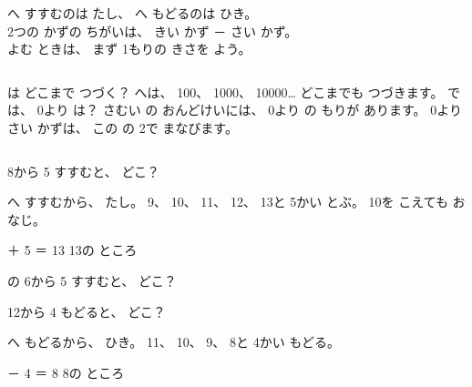 \begin{taisetsu}
へ すすむのは たし、 へ もどるのは ひき。\\
2つの かずの ちがいは、 きい かず － さい かず。\\
よむ ときは、 まず 1もりの きさを よう。
\end{taisetsu}

\begin{column}{は どこまで つづく？}
へは、 100、 1000、 10000… どこまでも つづきます。 では、 0より は？ さむい の おんどけいには、 0より の もりが あります。 0より さい かずは、 この の 2で まなびます。
\end{column}

\clearpage

\begin{reidai}[\R{右}{みぎ}へ すすむ]
8から 5 すすむと、 どこ？
\begin{bkfigure}
\end{bkfigure}
\kangaekata {}へ すすむから、 たし。 9、 10、 11、 12、 13と 5かい とぶ。 10を こえても おなじ。

 ＋ 5 ＝ 13 \kotaenext 13の ところ
\end{reidai}

\begin{jibun}
の 6から 5 すすむと、 どこ？
\bkshikiran[9\zw]
\end{jibun}

\begin{reidai}
12から 4 もどると、 どこ？
\begin{bkfigure}
\end{bkfigure}
\kangaekata {}へ もどるから、 ひき。 11、 10、 9、 8と 4かい もどる。

 － 4 ＝ 8 \kotaenext 8の ところ

\end{reidai}

